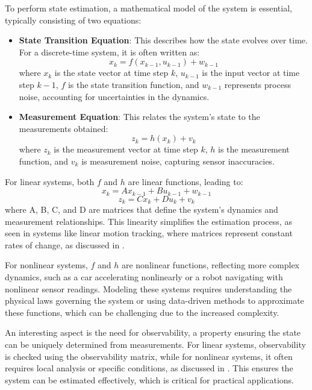 To perform state estimation, a mathematical model of the system is essential, typically consisting of two equations:
\begin{itemize}
    \item \textbf{State Transition Equation}: This describes how the state evolves over time. For a discrete-time system, it is often written as:
    \begin{equation}
        x_k = f(x_{k-1}, u_{k-1}) + w_{k-1}
    \end{equation}
    where $x_k$ is the state vector at time step $k$, $u_{k-1}$ is the input vector at time step $k-1$, $f$ is the state transition function, and $w_{k-1}$ represents process noise, accounting for uncertainties in the dynamics.
    \item \textbf{Measurement Equation}: This relates the system's state to the measurements obtained:
    \begin{equation}
        z_k = h(x_k) + v_k
    \end{equation}
    where $z_k$ is the measurement vector at time step $k$, $h$ is the measurement function, and $v_k$ is measurement noise, capturing sensor inaccuracies. 
\end{itemize}
For linear systems, both $f$ and $h$ are linear functions, leading to:
\begin{equation}
    x_k = A x_{k-1} + B u_{k-1} + w_{k-1}
\end{equation}
\begin{equation}
    z_k = C x_k + D u_k + v_k
\end{equation}
where A, B, C, and D are matrices that define the system's dynamics and measurement relationships. This linearity simplifies the estimation process, as seen in systems like linear motion tracking, where matrices represent constant rates of change, as discussed in \cite{kalman}.

For nonlinear systems, $f$ and $h$ are nonlinear functions, reflecting more complex dynamics, such as a car accelerating nonlinearly or a robot navigating with nonlinear sensor readings. Modeling these systems requires understanding the physical laws governing the system or using data-driven methods to approximate these functions, which can be challenging due to the increased complexity.

An interesting aspect is the need for observability, a property ensuring the state can be uniquely determined from measurements. For linear systems, observability is checked using the observability matrix, while for nonlinear systems, it often requires local analysis or specific conditions, as discussed in \cite{s18010217}. This ensures the system can be estimated effectively, which is critical for practical applications.

